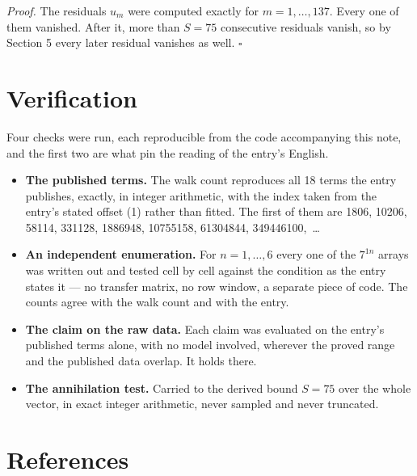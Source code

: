 \documentclass[11pt]{article}
\theoremstyle{definition}
\begin{document}
{\itshape Proof.} The residuals $u_m$ were computed exactly for $m = 1,\dots,137$. Every one of them vanished. After it, more than $S = 75$ consecutive residuals vanish, so by Section 5 every later residual vanishes as well. $\square$

\section{Verification}

Four checks were run, each reproducible from the code accompanying this note, and the first two are what pin the reading of the entry's English.

\begin{itemize}

\item {\bfseries The published terms.} The walk count reproduces all 18 terms the entry publishes, exactly, in integer arithmetic, with the index taken from the entry's stated offset (1) rather than fitted. The first of them are 1806, 10206, 58114, 331128, 1886948, 10755158, 61304844, 349446100,~\dots

\item {\bfseries An independent enumeration.} For $n = 1,\dots,6$ every one of the $7^{1n}$ arrays was written out and tested cell by cell against the condition as the entry states it --- no transfer matrix, no row window, a separate piece of code. The counts agree with the walk count and with the entry.

\item {\bfseries The claim on the raw data.} Each claim was evaluated on the entry's published terms alone, with no model involved, wherever the proved range and the published data overlap. It holds there.

\item {\bfseries The annihilation test.} Carried to the derived bound $S = 75$ over the whole vector, in exact integer arithmetic, never sampled and never truncated.

\end{itemize}

\section{References}
\end{document}
